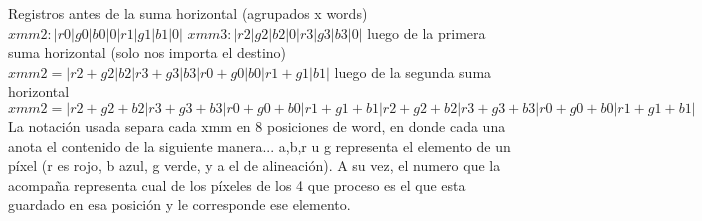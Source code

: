 \documentclass[a4paper]{article}
\begin{document}
   Registros antes de la suma horizontal (agrupados x words)
   \hfill \break
  $ xmm2 :| r0 | g0 | b0 | 0 | r1 | g1 | b1 | 0 | $
  $ xmm3 :| r2 | g2 | b2 | 0 | r3 | g3 | b3 | 0 |$
   \hfill \break
   luego de la primera suma horizontal (solo nos importa el destino)
   \hfill \break
   $xmm2 = | r2+g2 | b2 | r3+g3 | b3 | r0+g0 | b0 | r1+g1 | b1 |$
   \hfill \break
   luego de la segunda suma horizontal 
   \hfill \break
   $xmm2 = | r2+g2+b2 | r3+g3+b3 | r0+g0+b0 | r1+g1+b1 | r2+g2+b2 | r3+g3+b3 | r0+g0+b0 | r1+g1+b1 |$
   \hfill \break
   \\
   La notación usada separa cada xmm en 8 posiciones de word, en donde cada una anota el contenido de la siguiente manera... a,b,r u g representa el elemento de un píxel (r es rojo, b azul, g verde, y a el de alineación). A su vez, el numero que la acompaña  representa cual de los píxeles de los 4 que proceso es el que esta guardado en esa posición y le corresponde ese elemento.
   \hfill \break
   \\
   
\end{document}
